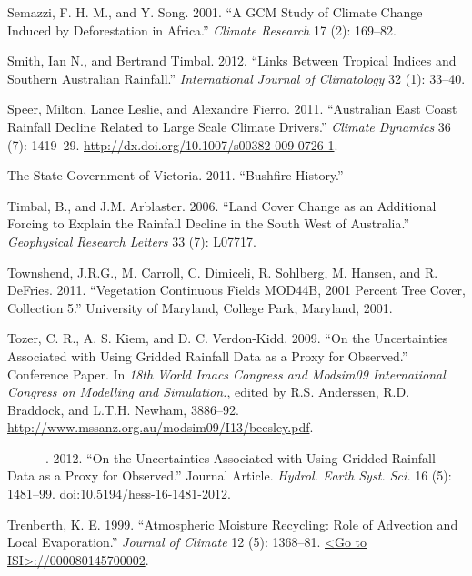 \documentclass[fleqn,10pt,lineno]{wlpeerj} %
\begin{document}
\hypertarget{ref-Semazzi2001}{}
Semazzi, F. H. M., and Y. Song. 2001. ``A GCM Study of Climate Change
Induced by Deforestation in Africa.'' \emph{Climate Research} 17 (2):
169--82.

\hypertarget{ref-Smith2012}{}
Smith, Ian N., and Bertrand Timbal. 2012. ``Links Between Tropical
Indices and Southern Australian Rainfall.'' \emph{International Journal
of Climatology} 32 (1): 33--40.

\hypertarget{ref-Speer2011}{}
Speer, Milton, Lance Leslie, and Alexandre Fierro. 2011. ``Australian
East Coast Rainfall Decline Related to Large Scale Climate Drivers.''
\emph{Climate Dynamics} 36 (7): 1419--29.
\url{http://dx.doi.org/10.1007/s00382-009-0726-1}.

\hypertarget{ref-Fire2011}{}
The State Government of Victoria. 2011. ``Bushfire History.''

\hypertarget{ref-Timbal2006}{}
Timbal, B., and J.M. Arblaster. 2006. ``Land Cover Change as an
Additional Forcing to Explain the Rainfall Decline in the South West of
Australia.'' \emph{Geophysical Research Letters} 33 (7): L07717.

\hypertarget{ref-Townshend2011}{}
Townshend, J.R.G., M. Carroll, C. Dimiceli, R. Sohlberg, M. Hansen, and
R. DeFries. 2011. ``Vegetation Continuous Fields MOD44B, 2001 Percent
Tree Cover, Collection 5.'' University of Maryland, College Park,
Maryland, 2001.

\hypertarget{ref-Beesley2009}{}
Tozer, C. R., A. S. Kiem, and D. C. Verdon-Kidd. 2009. ``On the
Uncertainties Associated with Using Gridded Rainfall Data as a Proxy for
Observed.'' Conference Paper. In \emph{18th World Imacs Congress and
Modsim09 International Congress on Modelling and Simulation.}, edited by
R.S. Anderssen, R.D. Braddock, and L.T.H. Newham, 3886--92.
\href{http://www.mssanz.org.au/modsim09/I13/beesley.pdf\%20}{http://www.mssanz.org.au/modsim09/I13/beesley.pdf}.

\hypertarget{ref-Tozer2012}{}
---------. 2012. ``On the Uncertainties Associated with Using Gridded
Rainfall Data as a Proxy for Observed.'' Journal Article. \emph{Hydrol.
Earth Syst. Sci.} 16 (5): 1481--99.
doi:\href{https://doi.org/10.5194/hess-16-1481-2012}{10.5194/hess-16-1481-2012}.

\hypertarget{ref-Trenberth1999}{}
Trenberth, K. E. 1999. ``Atmospheric Moisture Recycling: Role of
Advection and Local Evaporation.'' \emph{Journal of Climate} 12 (5):
1368--81.
\href{\%3CGo\%20to\%20ISI\%3E://000080145700002}{\textless{}Go to ISI\textgreater{}://000080145700002}.
\end{document}
